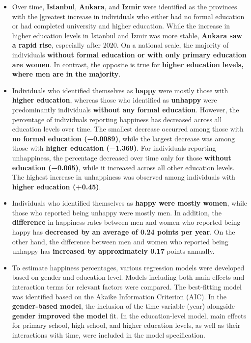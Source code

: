 \documentclass[
  11pt,
  a4paper,
  DIV=11,
  numbers=noendperiod]{scrartcl}
\begin{document}
\begin{itemize}
\item
  Over time, {\textbf{Istanbul}}, {\textbf{Ankara}}, and
  {\textbf{Izmir}} were identified as the provinces with the {[}greatest
  increase in individuals who either had no formal education or had
  completed university and higher education. While the increase in
  higher education levels in Istanbul and Izmir was more stable,
  {\textbf{Ankara saw a rapid rise}}, especially after 2020. On a
  national scale, the majority of individuals {\textbf{without formal
  education or with only primary education are women}}. In contrast, the
  opposite is true for {\textbf{higher education levels, where men are
  in the majority}}.
\item
  Individuals who identified themselves as {\textbf{happy}} were mostly
  those with {\textbf{higher education}}, whereas those who identified
  as {\textbf{unhappy}} were predominantly individuals {\textbf{without
  any formal education}}. However, the percentage of individuals
  reporting happiness has decreased across all education levels over
  time. The smallest decrease occurred among those with {\textbf{no
  formal education (−0.0089)}}, while the largest decrease was among
  those with {\textbf{higher education (−1.369)}}. For individuals
  reporting unhappiness, the percentage decreased over time only for
  those {\textbf{without education (−0.065)}}, while it increased across
  all other education levels. The highest increase in unhappiness was
  observed among individuals with {\textbf{higher education (+0.45)}}.
\item
  Individuals who identified themselves as {\textbf{happy were mostly
  women}}, while those who reported being unhappy were mostly men. In
  addition, the {\textbf{difference}} in happiness rates between men and
  women who reported being happy has {\textbf{decreased by an average of
  0.24 points per year}}. On the other hand, the difference between men
  and women who reported being unhappy has {\textbf{increased by
  approximately 0.17}} points annually.
\item
  To estimate happiness percentages, various regression models were
  developed based on gender and education level. Models including both
  main effects and interaction terms for relevant factors were compared.
  The best-fitting model was identified based on the Akaike Information
  Criterion (AIC). In the {\textbf{gender-based model}}, the inclusion
  of the time variable (year) alongside {\textbf{gender improved the
  model}} fit. In the education-level model, main effects for primary
  school, high school, and higher education levels, as well as their
  interactions with time, were included in the model specification.
\end{itemize}
\end{document}
